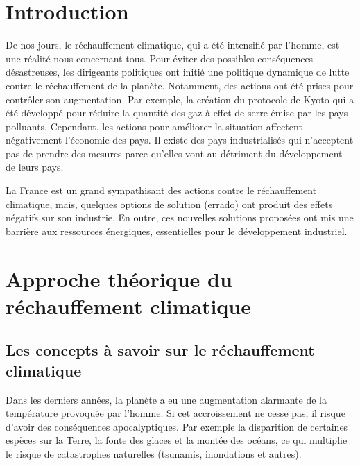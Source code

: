\documentclass[a4paper,10pt]{article}
\begin{document}
\thispagestyle{empty}
\titleTMB 
\newpage
\thispagestyle{empty}
\tableofcontents
\newpage
\setcounter{page}{1}

\section*{Introduction}

De nos jours, le réchauffement climatique, qui a été intensifié par l’homme, est
une réalité {\color{red}nous concernant  tous}.
Pour éviter  des possibles conséquences désastreuses,  les dirigeants politiques
ont  initié une  politique  dynamique de  lutte  contre le  réchauffement de  la
planète.   Notamment,  des   actions   ont  été   prises   pour  contrôler   son
augmentation. Par exemple, la création du protocole de Kyoto qui a été développé
pour réduire la quantité des gaz à  effet de serre émise par les pays polluants.
Cependant,  les  actions  pour  améliorer la  situation  affectent  négativement
l’économie  des  pays.  Il   existe  des  pays  industrialisés  qu{\color{red}i}
n’acceptent pas {\color{red}de} prendre des mesures parce qu’elles vont {\color{red}au} détriment du développement de leurs pays.

La  France  est  un  grand  sympathisant des  actions  contre  le  réchauffement
climatique, mais, {\color{red}quelques options de solution (errado)} ont produit des effets négatifs {\color{red}sur} son industrie. En outre, ces nouvelles solutions proposées ont mis {\color{red}une} barrière aux ressources énergiques, essentielles pour le développement industriel. 


\section{Approche théorique du réchauffement climatique}
\subsection{Les concepts à savoir sur le réchauffement climatique}

Dans   les  derniers  années{\color{red},}  la planète a eu une augmentation alarmante de la température provoquée par l'homme. Si cet accroissement ne cesse pas{\color{red},} il risque d’avoir des conséquences   apocalyptiques.  Par  exemple la disparition  de certaines espèces {\color{red}sur} la Terre, la fonte des glaces et la montée  des océans{\color{red},} ce qui multiplie le risque de catastrophes naturelles (tsunamis, inondations et autres).
\end{document}
